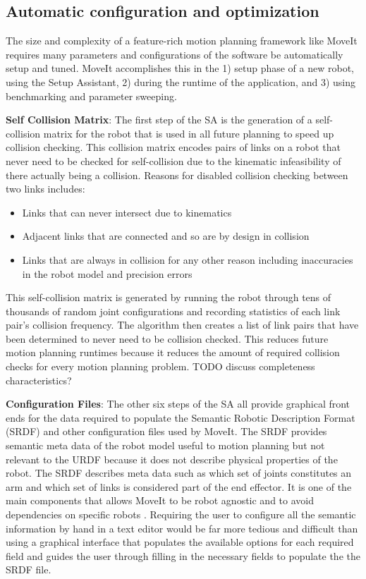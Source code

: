 \documentclass[10pt,journal,compsoc]{joser1}
\begin{document}
{%
\subsection{Automatic configuration and optimization}

The size and complexity of a feature-rich motion planning framework like MoveIt requires many parameters and configurations of the software be automatically setup and tuned. MoveIt accomplishes this in the 1) setup phase of a new robot, using the Setup Assistant, 2) during the runtime of the application, and 3) using benchmarking and parameter sweeping.

{\bf Self Collision Matrix}: The first step of the SA is the generation of a self-collision matrix for the robot that is used in all future planning to speed up collision checking. This collision matrix encodes pairs of links on a robot that never need to be checked for self-collision due to the kinematic infeasibility of there actually being a collision. Reasons for disabled collision checking between two links includes:
 
\begin{itemize}
    \item Links that can never intersect due to kinematics
    \item Adjacent links that are connected and so are by design in collision
    \item Links that are always in collision for any other reason including inaccuracies in the robot model and precision errors
\end{itemize}

This self-collision matrix is generated by running the robot through tens of thousands of random joint configurations and recording statistics of each link pair's collision frequency. The algorithm then creates a list of link pairs that have been determined to never need to be collision checked. This reduces future motion planning runtimes because it reduces the amount of required collision checks for every motion planning problem. TODO discuss completeness characteristics?

{\bf Configuration Files}: The other six steps of the SA all provide graphical front ends for the data required to populate the Semantic Robotic Description Format (SRDF) and other configuration files used by MoveIt. The SRDF provides semantic meta data of the robot model useful to motion planning but not relevant to the URDF because it does not describe physical properties of the robot. The SRDF describes meta data such as which set of joints constitutes an arm and which set of links is considered part of the end effector. It is one of the main components that allows MoveIt to be robot agnostic and to avoid dependencies on specific robots \cite{moveit}. Requiring the user to configure all the semantic information by hand in a text editor would be far more tedious and difficult than using a graphical interface that populates the available options for each required field and guides the user through filling in the necessary fields to populate the the SRDF file.

}
\end{document}
